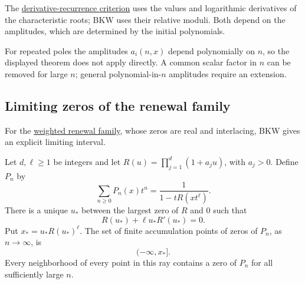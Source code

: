 The \hyperref[firstDerivativeCriterion]{derivative-recurrence criterion} uses the values and logarithmic
derivatives of the characteristic roots; BKW uses their relative moduli.
Both depend on the amplitudes, which are determined by the initial polynomials.

For repeated poles the amplitudes $a_i(n,x)$ depend polynomially on $n$,
so the displayed theorem does not apply directly. A common scalar factor
in $n$ can be removed for large $n$; general polynomial-in-$n$ amplitudes
require an extension.

\subsection[recurrenceRenewalLimitSet]{Limiting zeros of the renewal family}

For the \hyperref[interlacingRenewalTheorem]{weighted renewal family},
whose zeros are real and interlacing, BKW gives an explicit limiting
interval.

\begin{theorem}
Let $d,\ell\geq1$ be integers and let
$R(u)=\prod_{j=1}^d(1+a_ju)$, with $a_j>0$.
Define $P_n$ by
\[
 \sum_{n\geq0}P_n(x)t^n=\frac1{1-tR(xt^\ell)}.
\]
There is a unique $u_*$ between the largest zero of $R$ and $0$ such that
\[
 R(u_*)+\ell u_*R'(u_*)=0.
\]
Put $x_*=u_*R(u_*)^\ell$. The set of finite accumulation points of zeros
of $P_n$, as $n\to\infty$, is
\[
 (-\infty,x_*].
\]
Every neighborhood of every point in this ray contains a zero of $P_n$
for all sufficiently large $n$.
\end{theorem}

